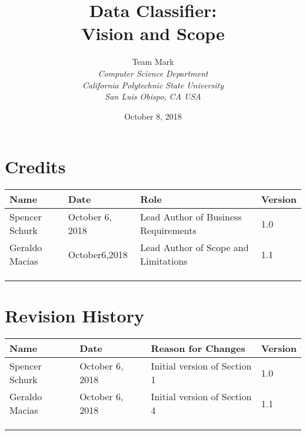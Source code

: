 \documentclass[12pt,oneside,letterpaper]{article}
\begin{document}
\title{\bfseries Data Classifier: \\Vision and Scope}

\author {
\large{Team Mark}\\
\emph{Computer Science Department}\\
\emph{California Polytechnic State University}\\
\emph{San Luis Obispo, CA USA}\\
}

\date{October 8, 2018}
\maketitle \thispagestyle{empty}

\pagebreak
\tableofcontents


\section*{Credits}
\begin{tabular}{|l|l|p{2in}|l|}
\hline
\textbf{Name}&\textbf{Date}&\textbf{Role}&\textbf{Version}\\
\hline
Spencer Schurk&October 6, 2018&Lead Author of Business Requirements&1.0\\
\hline
Geraldo Macias&October6,2018&Lead Author of Scope and Limitations&1.1\\
\hline
&&&\\
\hline
&&&\\
\hline
&&&\\
\hline
\end{tabular}


\section*{Revision History}
\begin{tabular}{|l|l|p{2in}|l|}
\hline
\textbf{Name}&\textbf{Date}&\textbf{Reason for Changes}&\textbf{Version}\\
\hline
Spencer Schurk&October 6, 2018&Initial version of Section 1&1.0\\
\hline
Geraldo Macias&October 6, 2018&Initial version of Section 4&1.1\\
\hline
&&&\\
\hline
&&&\\
\hline
&&&\\
\hline
\end{tabular}
\end{document}
